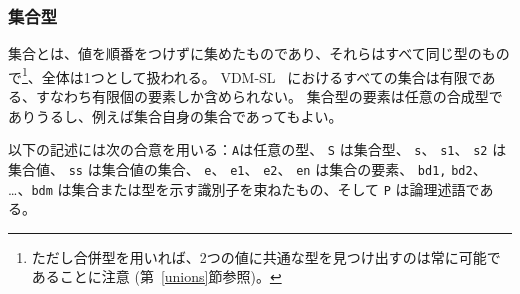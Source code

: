 \documentclass[\pformat,12pt]{jarticle}
\newcommand{\vdmslpp}[2]{%
#1
}
\newcommand{\vdmsl}{VDM-SL}
\newcommand{\vdmpp}{VDM++}
\begin{document}
\subsubsection{集合型}
\label{sets}

集合とは、値を順番をつけずに集めたものであり、それらはすべて同じ型のもので\footnote{ただし合併型を用いれば、2つの値に共通な型を見つけ出すのは常に可能であることに注意 (第~\ref{unions}節参照)。}、全体は1つとして扱われる。
\vdmslpp{\vdmsl}{\vdmpp}\ におけるすべての集合は有限である、すなわち有限個の要素しか含められない。 
集合型の要素は任意の合成型でありうるし、例えば集合自身の集合であってもよい。

以下の記述には次の合意を用いる：{\tt A}は任意の型、 {\tt S} は集合型、 {\tt s}、 {\tt s1}、 {\tt s2} は集合値、 {\tt ss} は集合値の集合、 {\tt e}、 {\tt e1}、 {\tt e2}、 {\tt en} は集合の要素、 {\tt bd1,} {\tt bd2}、 \ldots、{\tt bdm} は集合または型を示す識別子を束ねたもの、そして {\tt P} は論理述語である。
\end{document}
